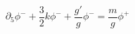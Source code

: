 \begin{equation}
\partial_5\phi^-+ \frac{3}{2}k \phi^- +\frac{g'}{g}\phi^-=\frac{m}{g}\phi^+
\end{equation}

